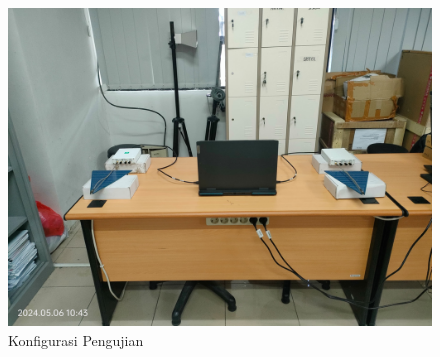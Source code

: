 \begin{figure}
	\begin{center}
		\includegraphics[scale=0.09]{pics/bab3/konfigurasiPengujian.jpg}
		\caption{Konfigurasi Pengujian}
		\label{img:konfigurasi}
	\end{center}
\end{figure}


